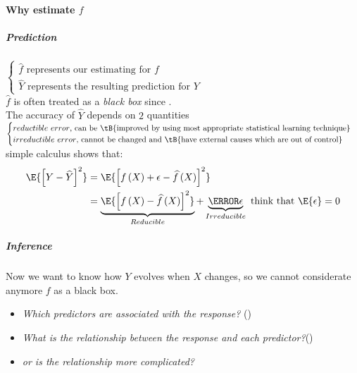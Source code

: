 \paragraph{Why estimate $f$}
\subparagraph{Prediction}
$
\begin{cases}
  \widehat{f}\text{ represents our estimating for }f\\
  \widehat{Y}\text{ represents the resulting prediction for }Y
\end{cases}$\\
$\widehat{f}$ is often treated as a \emph{black box} since .\\
The accuracy of $\widehat{Y}$ depends on $2$ quantities\\
$\begin{cases} 
  reductible~error\text{, can be \tB{improved by using most appropriate
  statistical learning technique}}\\
  irreductible~error\text{, cannot be changed and \tB{have external 
  causes which are out of control}}
\end{cases}$\\
 simple calculus shows that:
\begin{align*}
  \E{\left[Y-\widehat{Y}\right]^{2}}&=\E{\left[f\left( X \right)+\epsilon-\widehat{f}\left( X \right)\right]^{2}}\\
  &= \underbrace{\E{\left[ f\left( X \right)-\widehat{f}\left( X \right) \right]^{2}}}_{Reducible}+\underbrace{\V{\epsilon}}_{Irreducible}\text{ think that $\E{\epsilon}=0$}
\end{align*}
\subparagraph{Inference} Now we want to know how $Y$ evolves when $X$
changes, so we cannot considerate anymore $f$ as a black box.\\
\begin{itemize}
\item \emph{Which predictors are associated with the response?} ()
\item \emph{What is the relationship between the response and each
  predictor?}()
\item \emph{ or is the relationship
more complicated?}
\end{itemize}
